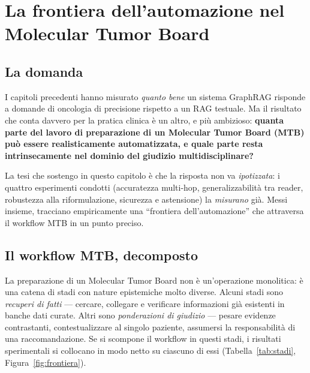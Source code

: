 \documentclass[11pt,a4paper]{report}
\begin{document}

\chapter{La frontiera dell'automazione nel Molecular Tumor Board}
\label{ch:frontiera-automazione}

\section{La domanda}

I capitoli precedenti hanno misurato \emph{quanto bene} un sistema GraphRAG
risponde a domande di oncologia di precisione rispetto a un RAG testuale. Ma
il risultato che conta davvero per la pratica clinica è un altro, e più
ambizioso: \textbf{quanta parte del lavoro di preparazione di un Molecular
Tumor Board (MTB) può essere realisticamente automatizzata, e quale parte
resta intrinsecamente nel dominio del giudizio multidisciplinare?}

La tesi che sostengo in questo capitolo è che la risposta non va
\emph{ipotizzata}: i quattro esperimenti condotti (accuratezza multi-hop,
generalizzabilità tra reader, robustezza alla riformulazione, sicurezza e
astensione) la \emph{misurano} già. Messi insieme, tracciano
empiricamente una ``frontiera dell'automazione'' che attraversa il workflow
MTB in un punto preciso.

\section{Il workflow MTB, decomposto}

La preparazione di un Molecular Tumor Board non è un'operazione monolitica:
è una catena di stadi con nature epistemiche molto diverse. Alcuni stadi
sono \emph{recuperi di fatti} --- cercare, collegare e verificare
informazioni già esistenti in banche dati curate. Altri sono
\emph{ponderazioni di giudizio} --- pesare evidenze contrastanti,
contestualizzare al singolo paziente, assumersi la responsabilità di una
raccomandazione. Se si scompone il workflow in questi stadi, i risultati
sperimentali si collocano in modo netto su ciascuno di essi
(Tabella~\ref{tab:stadi}, Figura~\ref{fig:frontiera}).
\end{document}
